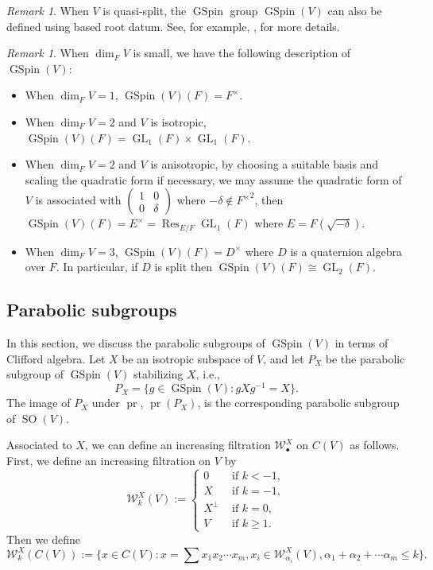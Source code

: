 \documentclass[12pt]{amsart}
\newcommand{\Res}{\operatorname{Res}}
\theoremstyle{remark}
\newtheorem{remark}[theorem]{Remark}%
\newcommand{\pr}{\operatorname{pr}}
\DeclareMathOperator{\GL}{GL}
\DeclareMathOperator{\SO}{SO}
\DeclareMathOperator{\GSpin}{GSpin}
\begin{document}
\begin{remark}
When $V$ is quasi-split, the $\GSpin$ group $\GSpin(V)$ can also be defined using based root datum. See, for example, \cite{AsgariShahidi2006, HundleySayag2016, AsgariCogdellShahidi2024}, for more details. 
\end{remark}

\begin{remark}
When $\dim_F V$ is small, we have the following description of $\GSpin(V)$:
\begin{itemize}
\item When $\dim_F V=1$, $\GSpin(V)(F)=F^\times$.
\item When $\dim_F V=2$ and $V$ is isotropic, $\GSpin(V)(F)=\GL_1(F)\times \GL_1(F)$.
\item When $\dim_F V=2$ and $V$ is anisotropic, by choosing a suitable basis and scaling the quadratic form if necessary, we may assume the quadratic form of $V$ is associated with $\left(\begin{smallmatrix} 1 & 0\\0& \delta\end{smallmatrix}\right)$ where $-\delta\not\in {F^\times}^2$, then $\GSpin(V)(F)=E^\times=\Res_{E/F}\GL_1(F)$ where $E=F(\sqrt{-\delta})$. 
\item When $\dim_F V=3$, $\GSpin(V)(F)=D^\times$ where $D$ is a quaternion algebra over $F$. In particular, if $D$ is split then $\GSpin(V)(F)\cong \GL_2(F)$. 
\end{itemize}
\end{remark}



\subsection{Parabolic subgroups}
\label{subsection-parabolic-subgroups}

In this section, we discuss the parabolic subgroups of $\GSpin(V)$ in terms of Clifford algebra.
Let $X$ be an isotropic subspace of $V$, and let $P_X$ be the parabolic subgroup of $\GSpin(V)$ stabilizing $X$, i.e., 
\begin{equation*}
 P_X=\{ g\in \GSpin(V): g X g^{-1}=X\}. 	
\end{equation*}
The image of $P_X$ under $\pr$, $\pr(P_X)$, is the corresponding parabolic subgroup of $\SO(V)$.

Associated to $X$, we can define an increasing filtration $\mathcal{W}^{X}_{\bullet}$ on $C(V)$ as follows. First, we define an increasing filtration on $V$ by
\begin{equation*}
\mathcal{W}_{k}^{X}(V):=\begin{cases}
0 & \text{ if }k<-1,\\
X & \text{ if }k=-1,\\
X^\perp & \text{ if }k=0,\\
V &\text{ if }k\ge 1.
\end{cases}
\end{equation*}
Then we define
\begin{equation*}
\mathcal{W}_{k}^{X}(C(V)):=\{x\in C(V): x=\sum x_1 x_2 \cdots x_m, x_i\in \mathcal{W}_{\alpha_i}^{X}(V), \alpha_1+\alpha_2+\cdots \alpha_m\le k \}.
\end{equation*}
\end{document}
